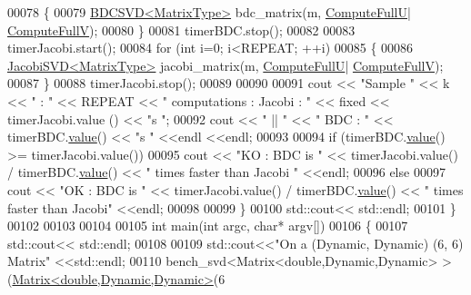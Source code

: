 \begin{DoxyCode}
00078     \{
00079       \hyperlink{group___s_v_d___module_class_eigen_1_1_b_d_c_s_v_d}{BDCSVD<MatrixType>} bdc\_matrix(m, \hyperlink{group__enums_ggae3e239fb70022eb8747994cf5d68b4a9a2b4f91ca5859a4159dbfe8090043817f}{ComputeFullU}|
      \hyperlink{group__enums_ggae3e239fb70022eb8747994cf5d68b4a9a52c6f7e80bbf9a42297c88f700245b51}{ComputeFullV});
00080     \}
00081     timerBDC.stop();
00082     
00083     timerJacobi.start();
00084     \textcolor{keywordflow}{for} (\textcolor{keywordtype}{int} i=0; i<REPEAT; ++i) 
00085     \{
00086       \hyperlink{group___s_v_d___module_class_eigen_1_1_jacobi_s_v_d}{JacobiSVD<MatrixType>} jacobi\_matrix(m, \hyperlink{group__enums_ggae3e239fb70022eb8747994cf5d68b4a9a2b4f91ca5859a4159dbfe8090043817f}{ComputeFullU}|
      \hyperlink{group__enums_ggae3e239fb70022eb8747994cf5d68b4a9a52c6f7e80bbf9a42297c88f700245b51}{ComputeFullV});
00087     \}
00088     timerJacobi.stop();
00089 
00090 
00091     cout << \textcolor{stringliteral}{"Sample "} << k << \textcolor{stringliteral}{" : "} << REPEAT << \textcolor{stringliteral}{" computations :  Jacobi : "} << fixed << timerJacobi.value
      () << \textcolor{stringliteral}{"s "};
00092     cout << \textcolor{stringliteral}{" || "} << \textcolor{stringliteral}{" BDC : "} << timerBDC.\hyperlink{class_eigen_1_1_bench_timer_a26760f963ed8b64c126159bfea57735e}{value}() << \textcolor{stringliteral}{"s "} <<endl <<endl;
00093       
00094     \textcolor{keywordflow}{if} (timerBDC.\hyperlink{class_eigen_1_1_bench_timer_a26760f963ed8b64c126159bfea57735e}{value}() >= timerJacobi.value())  
00095       cout << \textcolor{stringliteral}{"KO : BDC is "} <<  timerJacobi.value() / timerBDC.\hyperlink{class_eigen_1_1_bench_timer_a26760f963ed8b64c126159bfea57735e}{value}() << \textcolor{stringliteral}{"  times faster than Jacobi
      "} <<endl;
00096     \textcolor{keywordflow}{else} 
00097       cout << \textcolor{stringliteral}{"OK : BDC is "} << timerJacobi.value() / timerBDC.\hyperlink{class_eigen_1_1_bench_timer_a26760f963ed8b64c126159bfea57735e}{value}() << \textcolor{stringliteral}{"  times faster than Jacobi"}
        <<endl;
00098       
00099   \}
00100   std::cout<< std::endl;
00101 \}
00102 
00103 
00104 
00105 \textcolor{keywordtype}{int} main(\textcolor{keywordtype}{int} argc, \textcolor{keywordtype}{char}* argv[])
00106 \{
00107   std::cout<< std::endl;
00108 
00109   std::cout<<\textcolor{stringliteral}{"On a (Dynamic, Dynamic) (6, 6) Matrix"} <<std::endl;
00110   bench\_svd<Matrix<double,Dynamic,Dynamic> >(\hyperlink{group___core___module_class_eigen_1_1_matrix}{Matrix<double,Dynamic,Dynamic>}(6

\end{DoxyCode}
